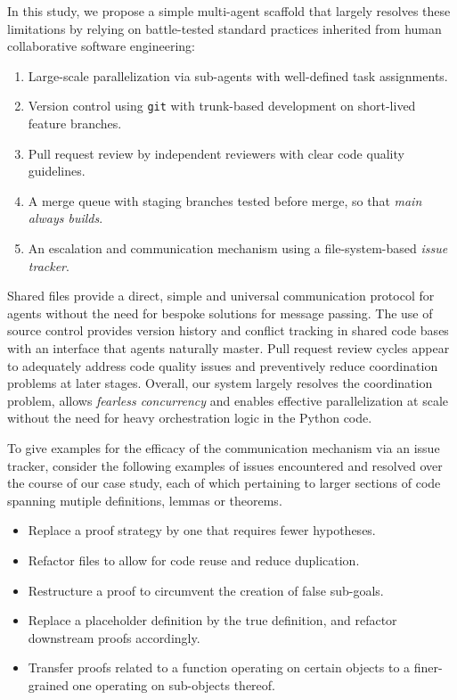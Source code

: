 \documentclass[]{fairmeta}
\begin{document}
In this study, we propose a simple multi-agent scaffold that largely resolves these limitations by relying on battle-tested standard practices inherited from human collaborative software engineering:
\begin{enumerate}[label=\Alph*)]
\item Large-scale parallelization via sub-agents with well-defined task assignments.
\item Version control using \texttt{git} with trunk-based development on short-lived feature branches.
\item Pull request review by independent reviewers with clear code quality guidelines.
\item A merge queue with staging branches tested before merge, so that \emph{main always builds}.
\item An escalation and communication mechanism using a file-system-based \emph{issue tracker}.
\end{enumerate}
Shared files provide a direct, simple and universal communication protocol for agents without the need for bespoke solutions for message passing.
The use of source control provides version history and conflict tracking in shared code bases with an interface that agents naturally master.
Pull request review cycles appear to adequately address code quality issues and preventively reduce coordination problems at later stages.
Overall, our system largely resolves the  coordination problem, allows \emph{fearless concurrency} and enables effective parallelization at scale without the need for heavy orchestration logic in the Python code.

To give examples for the efficacy of the communication mechanism via an issue tracker, consider the following examples of issues encountered and resolved over the course of our case study, each of which pertaining to larger sections of code spanning mutiple definitions, lemmas or theorems.
\begin{itemize}
\item Replace a proof strategy by one that requires fewer hypotheses.
\item Refactor files to allow for code reuse and reduce duplication.
\item Restructure a proof to circumvent the creation of false sub-goals.
\item Replace a placeholder definition by the true definition, and refactor downstream proofs accordingly.
\item Transfer proofs related to a function operating on certain objects to a finer-grained one operating on sub-objects thereof.
\end{itemize}
\end{document}
